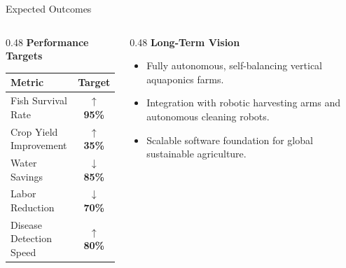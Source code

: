 \documentclass[aspectratio=169, 10pt]{beamer}
\begin{document}
\begin{frame}{Expected Outcomes}
  \begin{columns}[T]
    \begin{column}{0.48\textwidth}
      \textbf{Performance Targets}
      \begin{table}
        \small
        \begin{tabular}{lc}
          \toprule
          \textbf{Metric} & \textbf{Target} \\
          \midrule
          Fish Survival Rate & \textbf{$\uparrow$ 95\%} \\
          Crop Yield Improvement & \textbf{$\uparrow$ 35\%} \\
          Water Savings & \textbf{$\downarrow$ 85\%} \\
          Labor Reduction & \textbf{$\downarrow$ 70\%} \\
          Disease Detection Speed & \textbf{$\uparrow$ 80\%} \\
          \bottomrule
        \end{tabular}
      \end{table}
    \end{column}
    
    \begin{column}{0.48\textwidth}
      \textbf{Long-Term Vision}
      \begin{itemize}
        \item Fully autonomous, self-balancing vertical aquaponics farms.
        \item Integration with robotic harvesting arms and autonomous cleaning robots.
        \item Scalable software foundation for global sustainable agriculture.
      \end{itemize}
    \end{column}
  \end{columns}
\end{frame}
\end{document}
